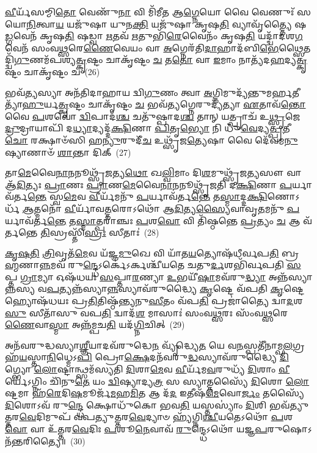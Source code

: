 \-\ul{𑌵𑍀}\-𑌰𑍍𑌯᳴𑌸𑌮𑍍𑌮𑌿\-\ul{𑌤𑍋} 𑌵𑍇𑌣𑍁᳴\-\ul{𑌨𑌾} 𑌵𑌿 𑌮𑌿᳴𑌮𑍀𑌤 𑌆\-\ul{𑌗𑍍𑌨𑍇}\-𑌯𑍋 𑌵𑍈 𑌵𑍇𑌣𑍁𑌃᳴ 𑌸𑌯𑍋\-\ul{𑌨𑌿}\-𑌤𑍍𑌵𑌾\-\ul{𑌯} 𑌯𑌜𑍁᳴𑌷𑌾 𑌯𑍁𑌨\-\ul{𑌕𑍍𑌤𑌿} 𑌯𑌜𑍁᳴𑌷𑌾 𑌕𑍃𑌷\-\ul{𑌤𑌿} 𑌵𑍍𑌯𑌾𑌵𑍃᳴𑌤𑍍𑌤𑍍𑌯𑍈 𑌷\-\ul{𑌡𑍍𑌗}\-𑌵𑍇𑌨᳴ 𑌕𑍃𑌷\-\ul{𑌤𑌿} 𑌷𑌡𑍍𑌵𑌾 \ul{𑌋}\-𑌤𑌵᳴ \ul{𑌋}\-𑌤𑍁𑌭𑌿᳴\-\ul{𑌰𑍇}\-𑌵𑍈𑌨𑌂᳴ 𑌕𑍃𑌷\-\ul{𑌤𑌿} 𑌯𑌦𑍍𑌦𑍍𑌵𑌾᳴𑌦𑌶\-\ul{𑌗}\-𑌵𑍇𑌨᳴ 𑌸𑌂𑌵\-\ul{𑌥𑍍𑌸}\-𑌰𑍇\-\ul{𑌣𑍈}\-𑌵𑍇𑌯𑌂 𑌵𑌾 \ul{𑌅}\-𑌗𑍍𑌨𑍇𑌰᳴𑌤𑌿\-\ul{𑌦𑌾}\-𑌹𑌾𑌦᳴𑌬𑌿\-\ul{𑌭𑍇}\-𑌥𑍍𑌸𑍈𑌤𑌦𑍍𑌦𑍍𑌵𑌿᳴\-\ul{𑌗𑍁}\-𑌣𑌮᳴𑌪𑌶𑍍𑌯\-\ul{𑌤𑍍𑌕𑍃}\-𑌷𑍍𑌟𑌂 𑌚𑌾𑌕𑍃᳴𑌷𑍍𑌟𑌂 \ul{𑌚} 𑌤\-\ul{𑌤𑍋} 𑌵𑌾 \ul{𑌇}\-𑌮𑌾𑌂 𑌨𑌾𑌤𑍍𑌯᳴𑌦\-\ul{𑌹}\-𑌦𑍍𑌯\-\ul{𑌤𑍍𑌕𑍃}\-𑌷𑍍𑌟𑌂 𑌚𑌾𑌕𑍃᳴𑌷𑍍𑌟𑌂 𑌚~(26)

𑌭𑌵᳴\-\ul{𑌤𑍍𑌯}\-𑌸𑍍𑌯𑌾 𑌅𑌨᳴𑌤𑌿𑌦𑌾𑌹𑌾𑌯 𑌦𑍍𑌵𑌿\-\ul{𑌗𑍁}\-𑌣𑌂 𑌤𑍍𑌵𑌾 \ul{𑌅}\-𑌗𑍍𑌨𑌿𑌮𑍁𑌦𑍍𑌯᳴𑌨𑍍𑌤𑍁𑌮𑌰𑍍\mbox{}\-\ul{𑌹}\-𑌤𑍀𑌤𑍍𑌯𑌾᳴\-\ul{𑌹𑍁}\-𑌰𑍍𑌯\-\ul{𑌤𑍍𑌕𑍃}\-𑌷𑍍𑌟𑌂 𑌚𑌾𑌕𑍃᳴𑌷𑍍𑌟𑌂 \ul{𑌚} 𑌭𑌵᳴\-\ul{𑌤𑍍𑌯}\-𑌗𑍍𑌨𑍇𑌰𑍁𑌦𑍍𑌯᳴𑌤𑍍𑌯𑌾 \ul{𑌏}\-𑌤𑌾𑌵᳴\-\ul{𑌨𑍍𑌤𑍋} 𑌵𑍈 \ul{𑌪}\-𑌶𑌵𑍋॑ \ul{𑌦𑍍𑌵𑌿}\-𑌪𑌾𑌦᳴\-\ul{𑌶𑍍𑌚} 𑌚𑌤𑍁᳴𑌷𑍍𑌪𑌾𑌦\-\ul{𑌶𑍍𑌚} 𑌤𑌾𑌨𑍍 𑌯𑌤𑍍𑌪𑍍𑌰𑌾𑌚᳴ 𑌉\-\ul{𑌥𑍍𑌸𑍃}\-𑌜𑍇\-\ul{𑌦𑍍𑌰𑍁}\-𑌦𑍍𑌰𑌾𑌯𑌾𑌪𑌿᳴ 𑌦\-\ul{𑌧𑍍𑌯𑌾}\-𑌦𑍍𑌯𑌦𑍍𑌦᳴\-\ul{𑌕𑍍𑌷𑌿}\-𑌣𑌾 \ul{𑌪𑌿}\-𑌤𑍃\-\ul{𑌭𑍍𑌯𑍋} 𑌨𑌿 𑌧𑍁᳴\-\ul{𑌵𑍇}\-𑌦𑍍𑌯\-\ul{𑌤𑍍𑌪𑍍𑌰}\-𑌤𑍀\-\ul{𑌚𑍋} 𑌰𑌕𑍍𑌷𑌾𑍞᳴𑌸𑌿 𑌹\-\ul{𑌨𑍍𑌯𑍁}\-𑌰𑍁𑌦𑍀᳴\-\ul{𑌚} 𑌉𑌥𑍍𑌸𑍃᳴𑌜\-\ul{𑌤𑍍𑌯𑍇}\-𑌷𑌾 𑌵𑍈 𑌦𑍇᳴𑌵𑌮\-\ul{𑌨𑍁}\-𑌷𑍍𑌯𑌾𑌣𑌾𑍞᳴ \ul{𑌶𑌾}\-𑌨𑍍𑌤𑌾 𑌦𑌿𑌕𑍍~(27)

𑌤𑌾\-\ul{𑌮𑍇}\-𑌵𑍈\-\ul{𑌨𑌾}\-𑌨𑌨𑍂𑌥𑍍𑌸𑍃᳴\-\ul{𑌜}\-𑌤𑍍𑌯\-\ul{𑌥𑍋} 𑌖\-\ul{𑌲𑍍𑌵𑌿}\-𑌮𑌾𑌂 𑌦𑌿\-\ul{𑌶}\-𑌮𑍁𑌥𑍍𑌸𑍃᳴𑌜\-\ul{𑌤𑍍𑌯}\-𑌸𑍗 𑌵𑌾 𑌆᳴\-\ul{𑌦𑌿}\-𑌤𑍍𑌯𑌃 \ul{𑌪𑍍𑌰𑌾}\-𑌣𑌃 \ul{𑌪𑍍𑌰𑌾}\-𑌣\-\ul{𑌮𑍇}\-𑌵𑍈\-\ul{𑌨𑌾}\-𑌨𑌨𑍂𑌥𑍍𑌸𑍃᳴𑌜𑌤𑌿 𑌦\-\ul{𑌕𑍍𑌷𑌿}\-𑌣𑌾 \ul{𑌪}\-𑌰𑍍𑌯𑌾𑌵᳴𑌰𑍍𑌤\-\ul{𑌨𑍍𑌤𑍇} 𑌸𑍍𑌵\-\ul{𑌮𑍇}\-𑌵 \ul{𑌵𑍀}\-𑌰𑍍𑌯᳴𑌮𑌨𑍁᳴ \ul{𑌪}\-𑌰𑍍𑌯𑌾𑌵᳴𑌰𑍍𑌤\-\ul{𑌨𑍍𑌤𑍇} 𑌤\-\ul{𑌸𑍍𑌮𑌾}\-𑌦𑍍𑌦\-\ul{𑌕𑍍𑌷𑌿}\-𑌣𑍋\-𑌽𑌰𑍍𑌧᳴ \ul{𑌆}\-𑌤𑍍𑌮𑌨𑍋᳴ \ul{𑌵𑍀}\-𑌰𑍍𑌯𑌾᳴𑌵\-\ul{𑌤𑍍𑌤}\-𑌰𑍋\-𑌽𑌥𑍋᳴ 𑌆\-\ul{𑌦𑌿}\-𑌤𑍍𑌯\-\ul{𑌸𑍍𑌯𑍈}\-𑌵𑌾𑌵𑍃\-\ul{𑌤}\-𑌮𑌨𑍁᳴ \ul{𑌪}\-𑌰𑍍𑌯𑌾𑌵᳴𑌰𑍍𑌤\-\ul{𑌨𑍍𑌤𑍇} 𑌤\-\ul{𑌸𑍍𑌮𑌾}\-𑌤𑍍𑌪𑌰𑌾॑𑌞𑍍𑌚𑌃 \ul{𑌪}\-𑌶\-\ul{𑌵𑍋} 𑌵𑌿 𑌤𑌿᳴𑌷𑍍𑌠𑌨𑍍𑌤𑍇 \ul{𑌪𑍍𑌰}\-𑌤𑍍𑌯𑌂 \ul{𑌚} 𑌆 𑌵᳴𑌰𑍍𑌤𑌨𑍍𑌤𑍇 \ul{𑌤𑌿}\-𑌸𑍍𑌰𑌸𑍍𑌤𑌿᳴\-\ul{𑌸𑍍𑌰𑌃} 𑌸𑍀𑌤𑌾𑌃॑~(28)

\-\ul{𑌕𑍃}\-\-\ul{𑌷}\-\-\ul{𑌤𑌿} \ul{𑌤𑍍𑌰𑌿}\-𑌵𑍃𑌤᳴\-\ul{𑌮𑍇}\-𑌵 𑌯᳴𑌜𑍍𑌞\-\ul{𑌮𑍁}\-𑌖𑍇 𑌵𑌿 𑌯𑌾᳴𑌤\-\ul{𑌯}\-𑌤𑍍𑌯𑍋𑌷᳴𑌧𑍀𑌰𑍍𑌵𑌪\-\ul{𑌤𑌿} 𑌬𑍍𑌰\-\ul{𑌹𑍍𑌮}\-𑌣𑌾\-\ul{𑌨𑍍𑌨}\-𑌮𑌵᳴ 𑌰𑍁\-\ul{𑌨𑍍𑌦𑍍𑌧𑍇}\-\-𑌽𑌰𑍍𑌕𑍇॑\-𑌽𑌰𑍍𑌕𑌶𑍍𑌚𑍀᳴𑌯𑌤𑍇 𑌚𑌤𑍁\-\ul{𑌰𑍍𑌦}\-𑌶𑌭𑌿᳴𑌰𑍍𑌵𑌪𑌤𑌿 \ul{𑌸}\-𑌪𑍍𑌤 \ul{𑌗𑍍𑌰𑌾}\-𑌮𑍍𑌯𑌾 𑌓𑌷᳴𑌧𑌯𑌃 \ul{𑌸}\-𑌪𑍍𑌤𑌾\-\ul{𑌰}\-𑌣𑍍𑌯𑌾 \ul{𑌉}\-𑌭𑌯𑍀᳴\-\ul{𑌷𑌾}\-𑌮𑌵᳴𑌰𑍁\-\ul{𑌦𑍍𑌧𑍍𑌯𑌾} 𑌅𑌨𑍍𑌨᳴𑌸𑍍𑌯𑌾𑌨𑍍𑌨𑌸𑍍𑌯 𑌵\-\ul{𑌪}\-𑌤𑍍𑌯𑌨𑍍𑌨᳴𑌸𑍍𑌯𑌾\-\ul{𑌨𑍍𑌨}\-𑌸𑍍𑌯𑌾𑌵᳴𑌰𑍁𑌦𑍍𑌧𑍍𑌯𑍈 \ul{𑌕𑍃}\-𑌷𑍍𑌟𑍇 𑌵᳴𑌪𑌤𑌿 \ul{𑌕𑍃}\-𑌷𑍍𑌟𑍇 𑌹𑍍𑌯𑍋𑌷᳴𑌧𑌯𑌃 𑌪𑍍𑌰\-\ul{𑌤𑌿}\-𑌤𑌿𑌷𑍍𑌠᳴𑌨𑍍𑌤𑍍𑌯𑌨𑍁\-\ul{𑌸𑍀}\-𑌤𑌂 𑌵᳴𑌪\-\ul{𑌤𑌿} 𑌪𑍍𑌰𑌜𑌾॑𑌤𑍍𑌯𑍈 𑌦𑍍𑌵𑌾\-\ul{𑌦}\-𑌶\-\ul{𑌸𑍁} 𑌸𑍀𑌤𑌾᳴𑌸𑍁 𑌵𑌪\-\ul{𑌤𑌿} 𑌦𑍍𑌵𑌾𑌦᳴\-\ul{𑌶} 𑌮𑌾𑌸𑌾𑌃॑ 𑌸𑌂𑌵\-\ul{𑌥𑍍𑌸}\-𑌰𑌃 𑌸𑌂᳴𑌵\-\ul{𑌥𑍍𑌸}\-𑌰𑍇\-\ul{𑌣𑍈}\-𑌵𑌾\-\ul{𑌸𑍍𑌮𑌾} 𑌅𑌨𑍍𑌨᳴𑌮𑍍𑌪𑌚\-\ul{𑌤𑌿} 𑌯𑌦᳴\-\ul{𑌗𑍍𑌨𑌿}\-𑌚𑌿𑌤𑍍~(29)

𑌅𑌨᳴𑌵𑌰𑍁𑌦𑍍𑌧𑌸𑍍𑌯𑌾\-\ul{𑌶𑍍𑌞𑍀}\-𑌯𑌾𑌦𑌵᳴𑌰𑍁𑌦𑍍𑌧𑍇\-\ul{𑌨} 𑌵𑍍𑌯𑍃᳴𑌦𑍍𑌧𑍍𑌯𑍇\-\ul{𑌤} 𑌯𑍇 𑌵\-\ul{𑌨}\-𑌸𑍍𑌪𑌤𑍀᳴𑌨𑌾𑌮𑍍𑌫\-\ul{𑌲}\-𑌗𑍍𑌰𑌹᳴\-\ul{𑌯}\-𑌸𑍍𑌤𑌾\-\ul{𑌨𑌿}\-𑌧𑍍𑌮𑍇\-𑌽\-\ul{𑌪𑌿} 𑌪𑍍𑌰𑍋\-\ul{𑌕𑍍𑌷𑍇}\-𑌦𑌨᳴𑌵𑌰𑍁\-\ul{𑌦𑍍𑌧}\-𑌸𑍍𑌯𑌾𑌵᳴𑌰𑍁𑌦𑍍𑌧𑍍𑌯𑍈 \ul{𑌦𑌿}\-𑌗𑍍𑌭𑍍𑌯𑍋 \ul{𑌲𑍋}\-𑌷𑍍𑌟𑌾𑌨𑍍𑌥𑍍𑌸𑌮᳴𑌸𑍍𑌯𑌤𑌿 \ul{𑌦𑌿}\-𑌶𑌾\-\ul{𑌮𑍇}\-𑌵 \ul{𑌵𑍀}\-𑌰𑍍𑌯᳴𑌮\-\ul{𑌵}\-𑌰𑍁𑌧𑍍𑌯᳴ \ul{𑌦𑌿}\-𑌶𑌾𑌂 \ul{𑌵𑍀}\-𑌰𑍍𑌯𑍇॑\-𑌽𑌗𑍍𑌨𑌿𑌂 𑌚𑌿᳴𑌨𑍁\-\ul{𑌤𑍇} 𑌯𑌂 \ul{𑌦𑍍𑌵𑌿}\-𑌷𑍍𑌯𑌾𑌦𑍍𑌯\-\ul{𑌤𑍍𑌰} 𑌸 𑌸𑍍𑌯𑌾𑌤𑍍𑌤𑌸𑍍𑌯𑍈᳴ \ul{𑌦𑌿}\-𑌶𑍋 \ul{𑌲𑍋}\-𑌷𑍍𑌟𑌮𑌾 𑌹᳴\-\ul{𑌰𑍇}\-𑌦𑌿\-\ul{𑌷}\-𑌮𑍂𑌰𑍍𑌜᳴\-\ul{𑌮}\-𑌹\-\ul{𑌮𑌿}\-𑌤 𑌆 𑌦᳴\-\ul{𑌦} 𑌇𑌤𑍀𑌷᳴\-\ul{𑌮𑍇}\-𑌵𑍋\-\ul{𑌰𑍍𑌜𑌂} 𑌤𑌸𑍍𑌯𑍈᳴ \ul{𑌦𑌿}\-𑌶𑍋\-𑌽𑌵᳴ 𑌰𑍁\-\ul{𑌨𑍍𑌦𑍍𑌧𑍇} 𑌕𑍍𑌷𑍋𑌧𑍁᳴𑌕𑍋 𑌭𑌵\-\ul{𑌤𑌿} 𑌯𑌸𑍍𑌤𑌸𑍍𑌯𑌾𑌂॑ \ul{𑌦𑌿}\-𑌶𑌿 𑌭𑌵᳴𑌤𑍍𑌯𑍁𑌤𑍍𑌤𑌰\-\ul{𑌵𑍇}\-𑌦𑌿𑌮𑍁𑌪᳴ 𑌵𑌪𑌤𑍍𑌯𑍁𑌤𑍍𑌤𑌰\-\ul{𑌵𑍇}\-𑌦𑍍𑌯𑌾𑍞 𑌹𑍍𑌯᳴𑌗𑍍𑌨𑌿\-\ul{𑌶𑍍𑌚𑍀}\-𑌯𑌤𑍇\-𑌽𑌥𑍋᳴ \ul{𑌪}\-𑌶\-\ul{𑌵𑍋} 𑌵𑌾 𑌉᳴𑌤𑍍𑌤𑌰\-\ul{𑌵𑍇}\-𑌦𑌿𑌃 \ul{𑌪}\-𑌶𑍂\-\ul{𑌨𑍇}\-𑌵𑌾𑌵᳴ \ul{𑌰𑍁}\-𑌨𑍍𑌦𑍍𑌧𑍇\-𑌽𑌥𑍋᳴ 𑌯𑌜𑍍𑌞\-\ul{𑌪}\-𑌰𑍁𑌷𑍋\-𑌽𑌨᳴𑌨𑍍𑌤𑌰𑌿𑌤𑍍𑌯𑍈॥~(30)

